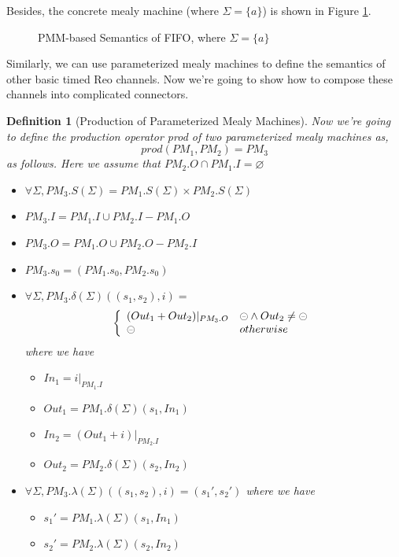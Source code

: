 \documentclass[conference, a4paper]{IEEEtran}
\newtheorem{definition}{Definition}
\newcommand{\rblock}[0]{\circleddash}
\begin{document}
Besides, the concrete mealy machine (where $\Sigma=\{a\}$) is shown in Figure \ref{fig:pmmfifo}.
\begin{figure}[h]
  \begin{center}
    
  \end{center}
  \caption{PMM-based Semantics of FIFO, where $\Sigma=\{a\}$}
  \label{fig:pmmfifo}
\end{figure}

Similarly, we can use parameterized mealy machines to define the semantics of other basic timed Reo
channels. Now we're going to show how to compose these channels into complicated connectors.

\begin{definition}[Production of Parameterized Mealy Machines]
  Now we're going to define the production operator \emph{prod} of two parameterized mealy machines as,
  \[
  prod(PM_1,PM_2)=PM_3
  \]
  as follows. Here we assume that $PM_2.O\cap PM_1.I=\varnothing$
  \begin{itemize}
  	\item[-] $\forall\Sigma, PM_3.S(\Sigma)=PM_1.S(\Sigma)\times PM_2.S(\Sigma)$
    \item[-] $PM_3.I=PM_1.I\cup PM_2.I-PM_1.O$
    \item[-] $PM_3.O=PM_1.O\cup PM_2.O-PM_2.I$
    \item[-] $PM_3.s_0=(PM_1.s_0, PM_2.s_0)$
    \item[-] $\forall\Sigma, PM_3.\delta(\Sigma)((s_1,s_2), i)=$
      \begin{displaymath}
        \left\{
        \begin{array}[h]{ll}
          (Out_1 + Out_2)|_{PM_3.O} & \rblock\land Out_2\neq\rblock \\
          \rblock & otherwise \\
        \end{array}
        \right.
      \end{displaymath}
      where we have
      \begin{itemize}
        \item[*] $In_1 = i|_{PM_1.I}$
        \item[*] $Out_1 = PM_1.\delta(\Sigma)(s_1,In_1)$
        \item[*] $In_2 = (Out_1 + i)|_{PM_2.I}$
        \item[*] $Out_2 = PM_2.\delta(\Sigma)(s_2,In_2)$
      \end{itemize}
    \item[-] $\forall\Sigma, PM_3.\lambda(\Sigma)((s_1,s_2),i)=(s_1',s_2')$
      where we have
      \begin{itemize}
        \item[*] $s_1' = PM_1.\lambda(\Sigma)(s_1,In_1)$
        \item[*] $s_2' = PM_2.\lambda(\Sigma)(s_2,In_2)$
      \end{itemize}
  \end{itemize}
\end{definition}
\end{document}
